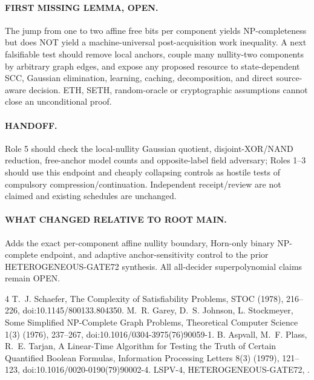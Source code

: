 \documentclass[11pt]{article}
\begin{document}
\paragraph{FIRST MISSING LEMMA, OPEN.} The jump from one to two affine free bits per component yields NP-completeness but does NOT yield a machine-universal post-acquisition work inequality. A next falsifiable test should remove local anchors, couple many nullity-two components by arbitrary graph edges, and expose any proposed resource to state-dependent SCC, Gaussian elimination, learning, caching, decomposition, and direct source-aware decision. ETH, SETH, random-oracle or cryptographic assumptions cannot close an unconditional proof.
\paragraph{HANDOFF.} Role 5 should check the local-nullity Gaussian quotient, disjoint-XOR/NAND reduction, free-anchor model counts and opposite-label field adversary; Roles 1--3 should use this endpoint and cheaply collapsing controls as hostile tests of compulsory compression/continuation. Independent receipt/review are not claimed and existing schedules are unchanged.
\paragraph{WHAT CHANGED RELATIVE TO ROOT MAIN.} Adds the exact per-component affine nullity boundary, Horn-only binary NP-complete endpoint, and adaptive anchor-sensitivity control to the prior HETEROGENEOUS-GATE72 synthesis. All all-decider superpolynomial claims remain OPEN.
\begin{thebibliography}{4}
 T.~J. Schaefer, The Complexity of Satisfiability Problems, STOC (1978), 216--226, doi:10.1145/800133.804350.
 M.~R. Garey, D.~S. Johnson, L. Stockmeyer, Some Simplified NP-Complete Graph Problems, Theoretical Computer Science 1(3) (1976), 237--267, doi:10.1016/0304-3975(76)90059-1.
 B. Aspvall, M.~F. Plass, R.~E. Tarjan, A Linear-Time Algorithm for Testing the Truth of Certain Quantified Boolean Formulas, Information Processing Letters 8(3) (1979), 121--123, doi:10.1016/0020-0190(79)90002-4.
 LSPV-4, HETEROGENEOUS-GATE72, .
\end{thebibliography}
\end{document}
